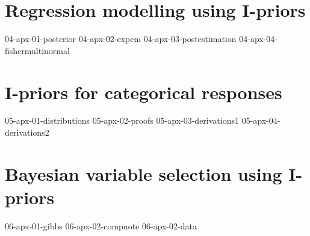 \documentclass[a4paper,showframe,11pt]{report}
\begin{document}
\appendix
\chapter{Regression modelling using I-priors}
{04-apx-01-posterior}
{04-apx-02-expem}
{04-apx-03-postestimation}
{04-apx-04-fishermultinormal}

\chapter{I-priors for categorical responses}
{05-apx-01-distributions}
{05-apx-02-proofs}
{05-apx-03-derivations1}
{05-apx-04-derivations2}

\chapter{Bayesian variable selection using I-priors}
{06-apx-01-gibbs}
{06-apx-02-compnote}
{06-apx-02-data}

\printindex
\end{document}

